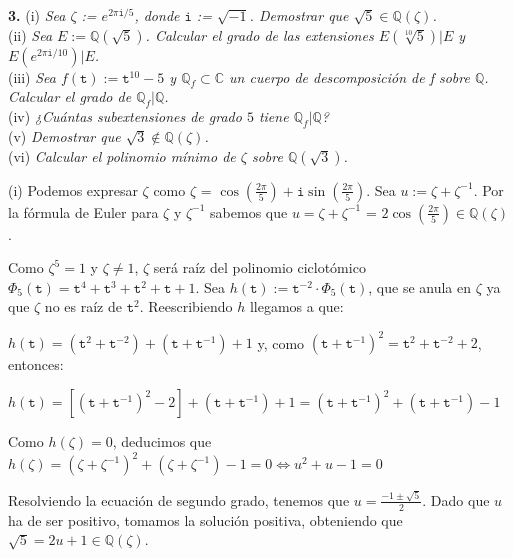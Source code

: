 \unaccentedoperators
\textbf{3.} (i) \textit{Sea $\zeta$ := $e^{2\pi \mathtt{i}/5}$, donde $\mathtt{i}$ := $\sqrt{-1}$. Demostrar que $\sqrt{5}\in \mathbb{Q}(\zeta)$.}
\\
(ii) \textit{Sea $E:=\mathbb{Q}(\sqrt{5})$. Calcular el grado de las extensiones $E\left(\sqrt[10]{5}\right)|E$ y $E\left(e^{2\pi \mathtt{i}/10}\right)|E$.}
\\
(iii) \textit{Sea $f(\mathtt{t}):=\mathtt{t}^{10}-5$ y $\mathbb{Q}_f \subset \mathbb{C}$ un cuerpo de descomposición de f sobre $\mathbb{Q}$. Calcular el grado de $\mathbb{Q}_f | \mathbb{Q}$.}
\\
(iv) \textit{¿Cuántas subextensiones de grado $5$ tiene $\mathbb{Q}_f | \mathbb{Q}$?}
\\
(v) \textit{Demostrar que $\sqrt{3} \notin \mathbb{Q}(\zeta)$.}
\\
(vi) \textit{Calcular el polinomio mínimo de $\zeta$ sobre $\mathbb{Q}(\sqrt{3})$.}

(i) Podemos expresar $\zeta$ como $\zeta$ = $\cos{\left(\frac{2\pi}{5}\right)} + \mathtt{i}\sin{\left(\frac{2\pi}{5}\right)}$. Sea $u:=\zeta + \zeta^{-1}$. Por la fórmula de Euler para $\zeta$ y  $\zeta^{-1}$ sabemos que $u = \zeta + \zeta^{-1}$ = $2\cos{\left(\frac{2\pi}{5}\right)} \in \mathbb{Q}\left(\zeta\right)$.

Como $\zeta^{5}=1$ y $\zeta\neq1$, $\zeta$ será raíz del polinomio ciclotómico $\Phi_{5}\left(\mathtt{t}\right) = \mathtt{t}^4+\mathtt{t}^3+\mathtt{t}^2+\mathtt{t}+1$. Sea $h\left(\mathtt{t}\right) := \mathtt{t}^{-2}\cdot\Phi_{5}(\mathtt{t})$, que se anula en $\zeta$ ya que $\zeta$ no es raíz de $\mathtt{t}^{2}$. Reescribiendo $h$ llegamos a que:

$h\left(\mathtt{t}\right) = \left(\mathtt{t}^2+\mathtt{t}^{-2}\right)+\left(\mathtt{t}+\mathtt{t}^{-1}\right)+1$ y, como $\left(\mathtt{t}+\mathtt{t}^{-1}\right)^2 = \mathtt{t}^2+\mathtt{t}^{-2}+2$, entonces:

$h\left(\mathtt{t}\right) = \left[\left(\mathtt{t}+\mathtt{t}^{-1}\right)^2-2\right]+\left(\mathtt{t}+\mathtt{t}^{-1}\right)+1 = \left(\mathtt{t}+\mathtt{t}^{-1}\right)^{2} + \left(\mathtt{t}+\mathtt{t}^{-1}\right) - 1$

Como $h\left(\zeta\right) = 0$, deducimos que $h\left(\zeta\right) = \left(\zeta + \zeta^{-1}\right)^{2}+\left(\zeta + \zeta^{-1}\right)-1 = 0 \Leftrightarrow u^{2}+u-1 = 0$

Resolviendo la ecuación de segundo grado, tenemos que $u = \frac{-1\pm \sqrt{5}}{2}$. Dado que $u$ ha de ser positivo, tomamos la solución positiva, obteniendo que $\sqrt{5} = 2u+1 \in\mathbb{Q}\left(\zeta\right)$.

